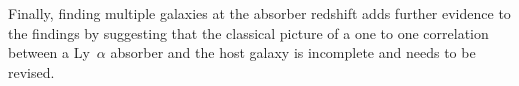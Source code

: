 \documentclass[a4paper,fleqn,usenatbib]{mnras}
\begin{document}
{Finally, finding multiple galaxies at the absorber redshift adds further evidence to the findings by \citet{Whiting2006mos, Kacprzak2010galaxy, Gauthier2013ultra, Rahmani2017observational, Bielby2017probing, Fumagalli2017witnessing, Peroux2017nature} suggesting that the classical picture of a one to one correlation between a Ly~$\alpha$ absorber and the host galaxy is incomplete and needs to be revised.













}
\end{document}
